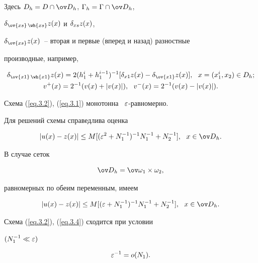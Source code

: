 Здесь $D_h=D \cap \od_h$, $\G_h=\G \cap \od_h$,


$\de_{\ov{xs}\,\wh{xs}}z(x)$ и $\delta_{xs}z(x)$,


$\de_{\ov{xs}}z(x)$~-- вторая и первые (вперед и назад) разностные


производные, например,


\begin{gather*}


\de_{\ov{x1}\,\wh{x1}}z(x)=2(h_1^i+h_1^{i-1} )^{-1}


[\de_{x1}z(x)-\de_{\ov{x1}}z(x)], \ \ x=(x_1^i,x_2)\in D_h; \\


v^+(x)=2^{-1}(v(x)+|v(x)|), \ \ v^-(x)=2^{-1}(v(x)-|v(x)|).


\end{gather*}


Схема (\ref{eq.3.2}), (\ref{eq.3.1}) монотонна \cite{2} \ $\varepsilon$-равномерно.


Для решений схемы справедлива оценка


\begin{equation} \label{eq.3.3}


|u(x)-z(x)|\leq M[(\eps^2+N_1^{-1})^{-1}


N_1^{-1} + N_2^{-1}], \ \ x \in \od_h.


\end{equation}


В случае сеток


\begin{equation} \label{eq.3.4}


\od_h=\ovo_1 \times \om_2,


\end{equation}


равномерных по обеим переменным, имеем


\begin{equation} \label{eq.3.5}


|u(x)-z(x)| \leq M [(\eps+N_1^{-1})^{-1}


N_1^{-1} + N_2^{-1}], \ \ x\in \od_h.


\end{equation}


Схема (\ref{eq.3.2}), (\ref{eq.3.4}) сходится при условии


$(N^{-1}_1\ll \varepsilon)$


\begin{equation} \label{eq.3.51}


\eps^{-1}= o(N_1).


\end{equation}


